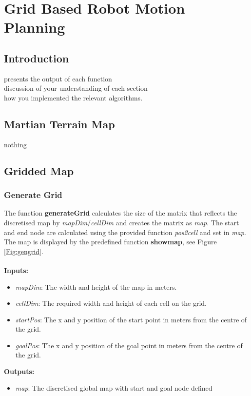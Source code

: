 \documentclass[Space3_Assign3.tex]{subfile}
\begin{document}
\section{Grid Based Robot Motion Planning} \label{Sec:Question1}
\subsection{Introduction}

presents the output of each function\\
discussion of your understanding of each section\\
how you implemented the relevant algorithms.

\subsection{Martian Terrain Map}
nothing
\subsection{Gridded Map}
\subsubsection{Generate Grid}\label{Sec:gengrid}
The function \textbf{generateGrid} calculates the size of the matrix that reflects the discretised map by \textit{mapDim}/\textit{cellDim} and creates the matrix as \textit{map}. The start and end node are calculated using the provided function \textit{pos2cell} and set in \textit{map}. The map is displayed by the predefined function \textbf{showmap}, see Figure \ref{Fig:gengrid}.\\\\
\textbf{Inputs:}
\begin{itemize}
\item \textit{mapDim}: The width and height of the map in meters.
\item \textit{cellDim}: The required width and height of each cell on the grid.
\item \textit{startPos}: The x and y position of the start point in meters from the centre of the grid.
\item \textit{goalPos}: The x and y position of the goal point in meters from the centre of the grid.
\end{itemize}
\textbf{Outputs:}                                                                                                                                                                                                                                                                                                                                                                                                                                                                       
\begin{itemize}
\item \textit{map}: The discretised global map with start and goal node defined
\end{itemize}
\end{document}
